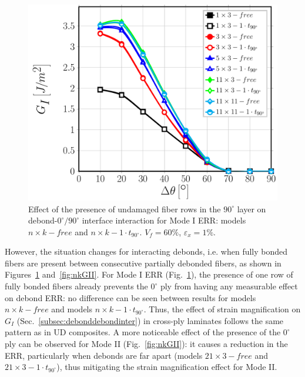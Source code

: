 \documentclass[review]{elsarticle}
\begin{document}
\begin{figure}[!h]
\centering
\includegraphics[width=\textwidth]{nxk-1-vf60-GI.pdf}
\caption{Effect of the presence of undamaged fiber rows in the $90^{\circ}$ layer on debond-$0^{\circ}/90^{\circ}$ interface interaction for Mode I ERR: models $n\times k-free$ and $n\times k-1\cdot t_{90^{\circ}}$. $V_{f}=60\%$, $\varepsilon_{x}=1\%$.}\label{fig:nkGI}
\end{figure}

However, the situation changes for interacting debonds, i.e. when fully bonded fibers are present between consecutive partially debonded fibers, as shown in Figures~\ref{fig:nkGI} and~\ref{fig:nkGII}. For Mode I ERR (Fig.~\ref{fig:nkGI}), the presence of one row of fully bonded fibers already prevents the $0^{\circ}$ ply from having any measurable effect on debond ERR: no difference can be seen between results for models $n\times k-free$ and models $n\times k-1\cdot t_{90^{\circ}}$. Thus, the effect of strain magnification on $G_{I}$ (Sec.~\ref{subsec:debonddebondinter}) in cross-ply laminates follows the same pattern as in UD composites. A more noticeable effect of the presence of the $0^{\circ}$ ply can be observed for Mode II (Fig.~\ref{fig:nkGII}): it causes a reduction in the ERR, particularly when debonds are far apart (models $21\times 3-free$ and $21\times 3-1\cdot t_{90^{\circ}}$), thus mitigating the strain magnification effect for Mode II.
\end{document}
